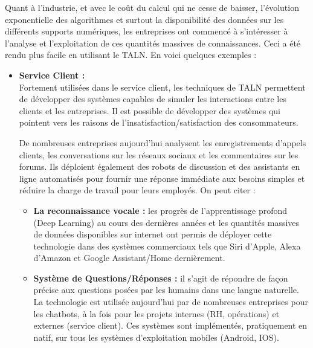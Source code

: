 Quant à l'industrie, et avec le coût du calcul qui ne cesse de baisser, l'évolution exponentielle des algorithmes et surtout la disponibilité des données sur les différents supports numériques, les entreprises ont commencé à s'intéresser à l'analyse et l'exploitation de ces quantités massives de connaissances. Ceci a été rendu plus facile en utilisant le TALN. En voici quelques exemples : 
\begin{itemize}[leftmargin={0.5cm}]
    \item \textbf{Service Client :}\\
    Fortement utilisées dans le service client, les techniques de TALN permettent de développer des systèmes capables de simuler les interactions entre les clients et les entreprises. Il est possible de développer des systèmes qui pointent vers les raisons de l'insatisfaction/satisfaction des consommateurs.

    De nombreuses entreprises aujourd'hui analysent les enregistrements d'appels clients, les conversations sur les réseaux sociaux et les commentaires sur les forums. Ils déploient également des robots de discussion et des assistants en ligne automatisés pour fournir une réponse immédiate aux besoins simples et réduire la charge de travail pour leurs employés. On peut citer : 
    \begin{itemize}
        \item \textbf{La reconnaissance vocale :} les progrès de l'apprentissage profond (Deep Learning) au cours des dernières années et les quantités massives de données disponibles sur internet ont permis de déployer cette technologie dans des systèmes commerciaux tels que Siri d'Apple, Alexa d'Amazon et Google Assistant/Home dernièrement.
        \item \textbf{Système de Questions/Réponses :} il s'agit de répondre de façon précise aux questions posées par les humains dans une langue naturelle. La technologie est utilisée aujourd'hui par de nombreuses entreprises pour les chatbots, à la fois pour les projets internes (RH, opérations) et externes (service client). Ces systèmes sont implémentés, pratiquement en natif, sur tous les systèmes d'exploitation mobiles (Android, IOS).\\
    \end{itemize}


\end{itemize}
